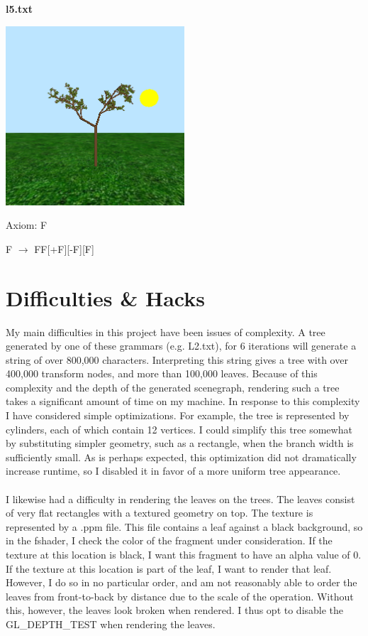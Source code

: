\documentclass[11pt]{article} %
\begin{document}
\newpage{}
{
\centering

\textbf{l5.txt} 

\includegraphics[width=0.5\textwidth]{005}

Axiom: F

F $\rightarrow$ FF[+F][-F][F]


}

\section{Difficulties \& Hacks} 

My main difficulties in this project have been issues of complexity. A tree generated by one of these grammars (e.g. L2.txt), for 6 iterations will generate a string of over 800,000 characters. Interpreting this string gives a tree with over 400,000 transform nodes, and more than 100,000 leaves. Because of this complexity and the depth of the generated scenegraph, rendering such a tree takes a significant amount of time on my machine. In response to this complexity I have considered simple optimizations. For example, the tree is represented by cylinders, each of which contain 12 vertices. I could simplify this tree somewhat by substituting simpler geometry, such as a rectangle, when the branch width is sufficiently small. As is perhaps expected, this optimization did not dramatically increase runtime, so I disabled it in favor of a more uniform tree appearance. 
\\ \\
\noindent I likewise had a difficulty in rendering the leaves on the trees. The leaves consist of very flat rectangles with a textured geometry on top. The texture is represented by a .ppm file. This file contains a leaf against a black background, so in the fshader, I check the color of the fragment under consideration. If the texture at this location is black, I want this fragment to have an alpha value of 0. If the texture at this location is part of the leaf, I want to render that leaf. However, I do so in no particular order, and am not reasonably able to order the leaves from front-to-back by distance due to the scale of the operation. Without this, however, the leaves look broken when rendered. I thus opt to disable the GL\_DEPTH\_TEST when rendering the leaves. 
\end{document}
